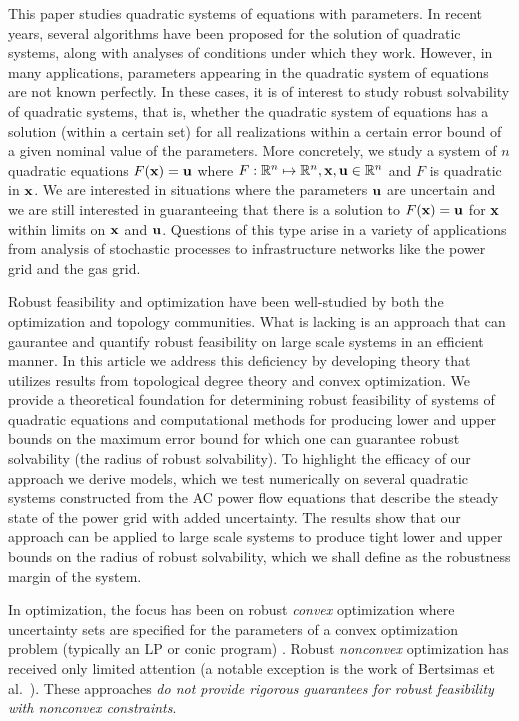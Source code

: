 This paper studies quadratic systems of equations with parameters.
In recent years, several algorithms have been proposed for the solution of quadratic systems, along with analyses of conditions under which they work. 
However, in many applications, parameters appearing in the quadratic system of equations are not known perfectly.
In these cases, it is of interest to study robust solvability of quadratic systems, that is, whether the quadratic system of equations has a solution (within a certain set) for all realizations within a certain error bound of a given nominal value of the parameters.
  More concretely, we study a system of $n$ quadratic equations $F(\bold x)=\bold u$ where $F: \mathbb{R}^n \mapsto \mathbb{R}^n,\bold  x,\bold u \in \mathbb{R}^n$ and $F$ is quadratic in $\bold x$.
  We are interested in situations where the parameters $\bold u$ are uncertain and we are still interested in guaranteeing that there is a solution to $F(\bold x) = \bold u$ for $\bold x$ within limits on $\bold x$ and $\bold u$.
  Questions of this type arise in a variety of applications from analysis of stochastic processes to infrastructure networks like the power grid and the gas grid.

  
Robust feasibility and optimization have been well-studied by both the optimization and topology communities. 
What is lacking is an approach that can gaurantee and quantify robust feasibility on large scale systems in an efficient manner. 
In this article we address this deficiency by developing theory that utilizes results from topological degree theory and convex optimization. 
We provide a theoretical foundation for determining robust feasibility of systems of quadratic equations and computational methods for producing lower and upper bounds on the maximum error bound for which one can guarantee robust solvability (the radius of robust solvability). 
To highlight the efficacy of our approach we derive models, which we test numerically on several quadratic systems constructed from the AC power flow equations that describe the steady state of the power grid with added uncertainty. 
The results show that our approach can be applied to large scale systems to produce tight lower and upper bounds on the radius of robust solvability, which we shall define as the robustness margin of the system.

In optimization, the focus has been on robust \emph{convex} optimization where uncertainty sets are specified for the parameters of a convex optimization problem (typically an LP or conic program) \cite{ben2009robust}.
Robust \emph{nonconvex} optimization has received only limited attention (a notable exception is the work of Bertsimas et al.~\cite{BeNoTe2010}).
These approaches {\em do not provide rigorous guarantees for robust feasibility with nonconvex constraints}.

